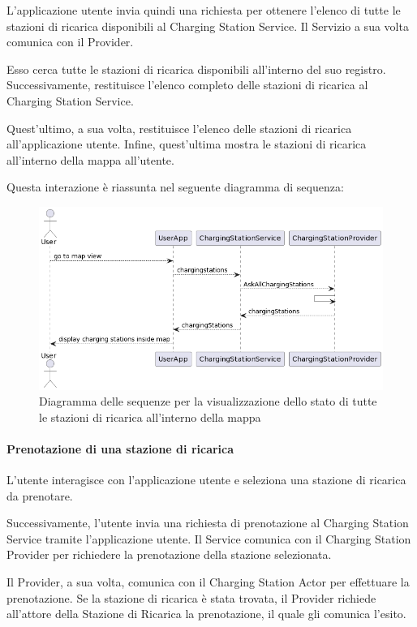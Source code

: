 L'applicazione utente invia quindi una richiesta per ottenere l'elenco di tutte le stazioni di ricarica disponibili al Charging Station Service. Il Servizio a sua volta comunica con il Provider.

Esso cerca tutte le stazioni di ricarica disponibili all'interno del suo registro. Successivamente, restituisce l'elenco completo delle stazioni di ricarica al Charging Station Service.

Quest'ultimo, a sua volta, restituisce l'elenco delle stazioni di ricarica all'applicazione utente. Infine, quest'ultima mostra le stazioni di ricarica all'interno della mappa all'utente.

Questa interazione è riassunta nel seguente diagramma di sequenza:

\begin{figure}[htbp]
    \centering
    \includegraphics[width=\textwidth]{images/ask-all-stations.png}
    \caption{Diagramma delle sequenze per la visualizzazione dello stato di tutte le stazioni di ricarica all'interno della mappa}
    \label{fig:ask-all-stations}
\end{figure}

\paragraph{Prenotazione di una stazione di ricarica}
L'utente interagisce con l'applicazione utente e seleziona una stazione di ricarica da prenotare.

Successivamente, l'utente invia una richiesta di prenotazione al Charging Station Service tramite l'applicazione utente. Il Service comunica con il Charging Station Provider per richiedere la prenotazione della stazione selezionata.

Il Provider, a sua volta, comunica con il Charging Station Actor per effettuare la prenotazione. Se la stazione di ricarica è stata trovata, il Provider richiede all'attore della Stazione di Ricarica la prenotazione, il quale gli comunica l'esito.

